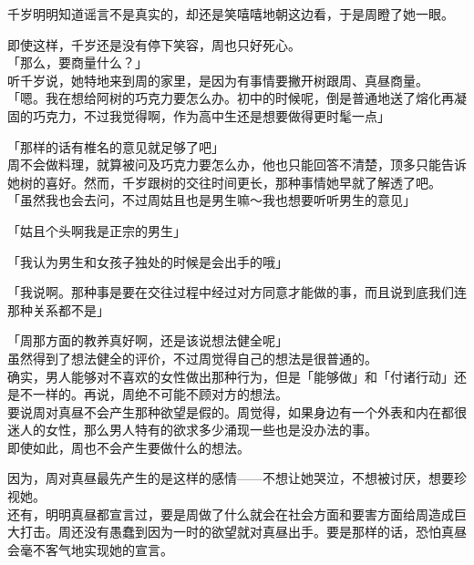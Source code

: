 千岁明明知道谣言不是真实的，却还是笑嘻嘻地朝这边看，于是周瞪了她一眼。

即使这样，千岁还是没有停下笑容，周也只好死心。\\

「那么，要商量什么？」\\

听千岁说，她特地来到周的家里，是因为有事情要撇开树跟周、真昼商量。\\

「嗯。我在想给阿树的巧克力要怎么办。初中的时候呢，倒是普通地送了熔化再凝固的巧克力，不过我觉得啊，作为高中生还是想要做得更时髦一点」

「那样的话有椎名的意见就足够了吧」\\

周不会做料理，就算被问及巧克力要怎么办，他也只能回答不清楚，顶多只能告诉她树的喜好。然而，千岁跟树的交往时间更长，那种事情她早就了解透了吧。\\

「虽然我也会去问，不过周姑且也是男生嘛～我也想要听听男生的意见」

「姑且个头啊我是正宗的男生」

「我认为男生和女孩子独处的时候是会出手的哦」

「我说啊。那种事是要在交往过程中经过对方同意才能做的事，而且说到底我们连那种关系都不是」

「周那方面的教养真好啊，还是该说想法健全呢」\\

虽然得到了想法健全的评价，不过周觉得自己的想法是很普通的。\\

确实，男人能够对不喜欢的女性做出那种行为，但是「能够做」和「付诸行动」还是不一样的。再说，周绝不可能不顾对方的想法。\\

要说周对真昼不会产生那种欲望是假的。周觉得，如果身边有一个外表和内在都很迷人的女性，那么男人特有的欲求多少涌现一些也是没办法的事。\\

即使如此，周也不会产生要做什么的想法。

因为，周对真昼最先产生的是这样的感情——不想让她哭泣，不想被讨厌，想要珍视她。\\

还有，明明真昼都宣言过，要是周做了什么就会在社会方面和要害方面给周造成巨大打击。周还没有愚蠢到因为一时的欲望就对真昼出手。要是那样的话，恐怕真昼会毫不客气地实现她的宣言。\\

